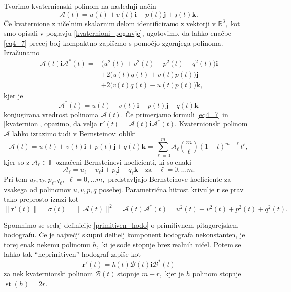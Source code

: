 \documentclass[12pt,a4paper,twoside]{article}
\theoremstyle{definition} %
\theoremstyle{plain} %
\theoremstyle{primerstyle}
\numberwithin{equation}{section}  %
\newcommand{\R}{\mathbb R}
\newcommand{\quat}{\mathbb H}
\newcommand{\rV}{\mathbf{r}}
\newcommand{\iV}{\mathbf{i}}
\newcommand{\jV}{\mathbf{j}}
\newcommand{\kV}{\mathbf{k}}
\newcommand{\AQ}{\mathcal{A}}
\newcommand{\BQ}{\mathcal{B}}
\DeclareMathOperator{\st}{st}
\begin{document}
Tvorimo kvaternionski polinom na naslednji način
\begin{equation}
	\AQ(t)=u(t)+v(t)\iV+p(t)\jV+q(t)\kV.
\end{equation}
Če kvaternione z ničelnim skalarnim delom identificiramo z vektorji v $\R^3,$ kot smo opisali v poglavju \ref{kvaternioni_poglavje}, ugotovimo, da lahko enačbe \eqref{eq4_7} precej bolj kompaktno zapišemo s pomočjo zgornjega polinoma. Izračunamo
\begin{align}
	\AQ(t)\iV\AQ^*(t)=&\big(u^2(t)+v^2(t)-p^2(t)-q^2(t)\big)\iV \nonumber \\
	&+2\big(u(t)q(t)+v(t)p(t)\big)\jV \label{kvaternion} \\
	&+2\big(v(t)q(t)-u(t)p(t)\big)\kV, \nonumber
\end{align}
kjer je
\begin{equation}
	\AQ^*(t)=u(t)-v(t)\iV-p(t)\jV-q(t)\kV
\end{equation}
konjugirana vrednost polinoma $\AQ(t).$ Če primerjamo formuli \eqref{eq4_7} in \eqref{kvaternion}, opazimo, da velja $\rV'(t)=\AQ(t)\iV\AQ^*(t).$ Kvaternionski polinom $\AQ$ lahko izrazimo tudi v Bernsteinovi obliki
\begin{equation}
	\AQ(t)=u(t)+v(t)\iV+p(t)\jV+q(t)\kV=\sum_{\ell=0}^m\AQ_{\ell} \binom{m}{\ell}(1-t)^{m-\ell}t^{\ell},
\end{equation}
kjer so z $\AQ_{\ell}\in\quat$ označeni Bernsteinovi koeficienti, ki so enaki
\begin{equation}
	\label{bern_koef_quat}
	\AQ_{\ell}=u_{\ell}+v_{\ell}\iV+p_{\ell}\jV+q_{\ell}\kV \quad \text{za} \quad \ell=0,\dots m.
\end{equation}
Pri tem $u_{\ell},v_{\ell},p_{\ell},q_{\ell},$ $\ell=0,\dots m,$ predstavljajo Bernsteinove koeficiente za vsakega od polinomov $u,v,p,q$ posebej. Parametrična hitrost krivulje $\rV$ se prav tako preprosto izrazi kot
\begin{equation}
	\label{kvaternionska_hitrost}
	\lVert \rV'(t) \rVert=\sigma(t)=\lVert \AQ(t) \rVert^2=\AQ(t) \AQ^*(t)=u^2(t)+v^2(t)+p^2(t)+q^2(t).
\end{equation}

Spomnimo se sedaj definicije \ref{primitiven_hodo} o primitivnem pitagorejskem hodografu. Če je največji skupni delitelj komponent hodografa nekonstanten, je torej enak nekemu polinomu $h,$ ki je sode stopnje brez realnih ničel. Potem se lahko tak ``neprimitiven'' hodograf zapiše kot
\begin{equation}
	\label{Bkvaternion}
	\rV'(t)=h(t)\BQ(t)\iV\BQ^*(t)
\end{equation}
za nek kvaternionski polinom $\BQ(t)$ stopnje $m-r,$ kjer je $h$ polinom stopnje $\st(h)=2r.$
\end{document}
